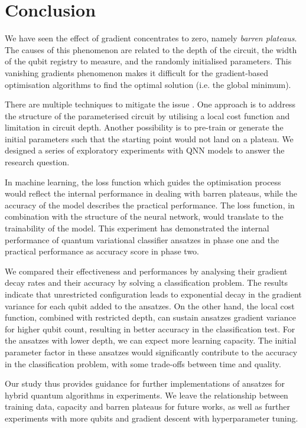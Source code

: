 \section{Conclusion}
We have seen the effect of gradient concentrates to zero, namely \emph{barren plateaus}.
The causes of this phenomenon are related to the depth of the circuit, the width of the qubit registry to measure, and the randomly initialised parameters.
This vanishing gradients phenomenon makes it difficult for the gradient-based optimisation algorithms to find the optimal solution (i.e. the global minimum).

There are multiple techniques to mitigate the issue \cite{cerezoCostFunctionDependent2021, skolikLayerwiseLearningQuantum2021, grantInitializationStrategyAddressing2019}.
One approach is to address the structure of the parameterised circuit by utilising a local cost function and limitation in circuit depth.
Another possibility is to pre-train or generate the initial parameters such that the starting point would not land on a plateau.
We designed a series of exploratory experiments with QNN models to answer the research question.

In machine learning, the loss function which guides the optimisation process would reflect the internal performance in dealing with barren plateaus, while the accuracy of the model describes the practical performance.
The loss function, in combination with the structure of the neural network, would translate to the trainability of the model.
This experiment has demonstrated the internal performance of quantum variational classifier ansatzes in phase one and the practical performance as accuracy score in phase two.

We compared their effectiveness and performances by analysing their gradient decay rates and their accuracy by solving a classification problem.
The results indicate that unrestricted configuration leads to exponential decay in the gradient variance for each qubit added to the ansatzes.
On the other hand, the local cost function, combined with restricted depth, can sustain ansatzes gradient variance for higher qubit count, resulting in better accuracy in the classification test.
For the ansatzes with lower depth, we can expect more learning capacity.
The initial parameter factor in these ansatzes would significantly contribute to the accuracy in the classification problem, with some trade-offs between time and quality.

Our study thus provides guidance for further implementations of ansatzes for hybrid quantum algorithms in experiments.
We leave the relationship between training data, capacity and barren plateaus for future works, as well as further experiments with more qubits and gradient descent with hyperparameter tuning.